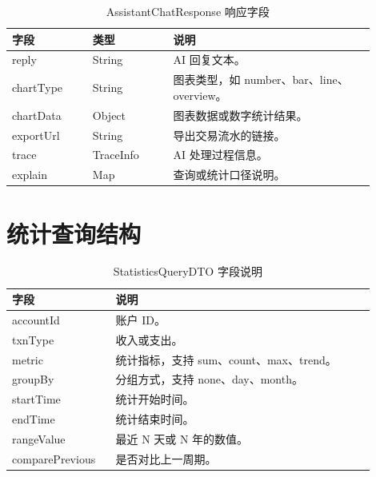 \documentclass[bachelor, print]{xduthesis}
\begin{document}
\begin{appendix}
\begin{table}[H]
    \centering
    \caption{AssistantChatResponse 响应字段}
    \label{tab:assistant-response}
    \begin{tabular}{|p{0.2\linewidth}|p{0.2\linewidth}|p{0.5\linewidth}|}
        \hline
        字段 & 类型 & 说明 \\
        \hline
        reply & String & AI 回复文本。 \\
        \hline
        chartType & String & 图表类型，如 number、bar、line、overview。 \\
        \hline
        chartData & Object & 图表数据或数字统计结果。 \\
        \hline
        exportUrl & String & 导出交易流水的链接。 \\
        \hline
        trace & TraceInfo & AI 处理过程信息。 \\
        \hline
        explain & Map & 查询或统计口径说明。 \\
        \hline
    \end{tabular}
\end{table}

\section{统计查询结构}

\begin{table}[H]
    \centering
    \caption{StatisticsQueryDTO 字段说明}
    \label{tab:statistics-query}
    \begin{tabular}{|p{0.25\linewidth}|p{0.65\linewidth}|}
        \hline
        字段 & 说明 \\
        \hline
        accountId & 账户 ID。 \\
        \hline
        txnType & 收入或支出。 \\
        \hline
        metric & 统计指标，支持 sum、count、max、trend。 \\
        \hline
        groupBy & 分组方式，支持 none、day、month。 \\
        \hline
        startTime & 统计开始时间。 \\
        \hline
        endTime & 统计结束时间。 \\
        \hline
        rangeValue & 最近 N 天或 N 年的数值。 \\
        \hline
        comparePrevious & 是否对比上一周期。 \\
        \hline
    \end{tabular}
\end{table}



\end{appendix}
\end{document}
